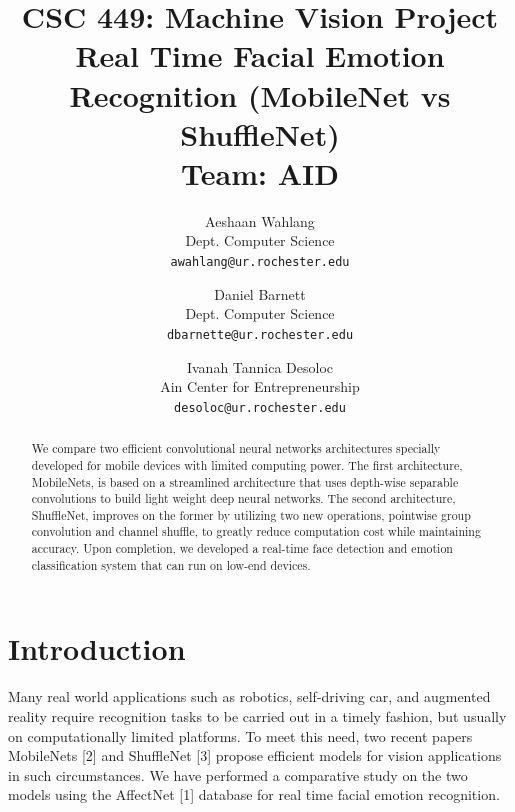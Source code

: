 \documentclass[10pt,twocolumn,letterpaper]{article}
\begin{document}
\title{CSC 449: Machine Vision Project
\\ Real Time Facial Emotion Recognition (MobileNet vs ShuffleNet)
\\Team: AID
}

\author{Aeshaan Wahlang\\
Dept. Computer Science\\
{\tt\small awahlang@ur.rochester.edu}
\and
Daniel Barnett\\
Dept. Computer Science\\
{\tt\small dbarnette@ur.rochester.edu}
\and
Ivanah Tannica Desoloc\\
Ain Center for Entrepreneurship\\
{\tt\small desoloc@ur.rochester.edu}
}

\maketitle

\begin{abstract}
   We compare two efficient convolutional neural networks architectures specially developed for mobile devices with limited computing power. The first architecture, MobileNets, is based on a streamlined architecture that uses depth-wise separable convolutions to build light weight deep neural networks. The second architecture, ShuffleNet, improves on the former by utilizing two new operations, pointwise group convolution and channel shuffle, to greatly reduce computation cost while maintaining accuracy. Upon completion, we developed a real-time face detection and emotion classification system that can run on low-end devices.
\end{abstract}

\section{Introduction}

Many real world applications such as robotics, self-driving car, and augmented reality require recognition tasks to be carried out in a timely fashion, but usually on computationally limited platforms. To meet this need, two recent papers MobileNets [2] and ShuffleNet [3] propose efficient models for vision applications in such circumstances. We have performed a comparative study on the two models using the AffectNet [1] database for real time facial emotion recognition.
\end{document}
